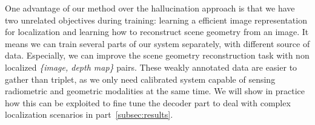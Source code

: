One advantage of our method over the hallucination approach is that we have two unrelated objectives during training: learning a efficient image representation for localization and learning how to reconstruct scene geometry from an image. It means we can train several parts of our system separately, with different source of data. Especially, we can improve the scene geometry reconstruction task with non localized \textit{\{image, depth map\}} pairs. These weakly annotated data are easier to gather than triplet, as we only need calibrated system capable of sensing radiometric and geometric modalities at the same time. We will show in practice how this can be exploited to fine tune the decoder part to deal with complex localization scenarios in part~\ref{subsec:results}.

